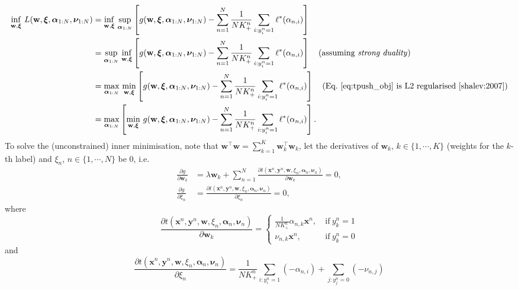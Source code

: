 \documentclass[9pt]{extarticle}
\newcommand{\x}{\mathbf{x}}
\newcommand{\y}{\mathbf{y}}
\newcommand{\1}{\mathbf{1}}
\newcommand{\w}{\mathbf{w}}
\newcommand{\alphabm}{\bm{\alpha}}
\newcommand{\nubm}{\bm{\nu}}
\newcommand{\xibm}{\bm{\xi}}
\newcommand{\ie}{i.e.\ }
\begin{document}
\begin{equation}
\label{eq:tpush_dual_func}
\begin{aligned}
\inf_{\w, \xibm} \, L(\w, \xibm, \alphabm_{1:N}, \nubm_{1:N})
&= \inf_{\w, \xibm} \, \underset{\alphabm_{1:N}}{\sup} \left[ g(\w, \xibm, \alphabm_{1:N}, \nubm_{1:N}) -
   \sum_{n=1}^N \frac{1}{N K_+^n} \sum_{i:y_i^n=1} \ell^*(\alpha_{n,i}) \right] \\
&= \underset{\alphabm_{1:N}}{\sup} \, \inf_{\w, \xibm} \left[ g(\w, \xibm, \alphabm_{1:N}, \nubm_{1:N}) -
   \sum_{n=1}^N \frac{1}{N K_+^n} \sum_{i:y_i^n=1} \ell^*(\alpha_{n,i}) \right] \quad 
   \text{(assuming \emph{strong duality})} \\
&= \underset{\alphabm_{1:N}}{\max} \, \min_{\w, \xibm} \left[ g(\w, \xibm, \alphabm_{1:N}, \nubm_{1:N}) -
   \sum_{n=1}^N \frac{1}{N K_+^n} \sum_{i:y_i^n=1} \ell^*(\alpha_{n,i}) \right] \quad
   \text{(Eq.~\ref{eq:tpush_obj} is L2 regularised~\cite{shalev:2007})} \\
&= \underset{\alphabm_{1:N}}{\max} \left[ \min_{\w, \xibm} \, g(\w, \xibm, \alphabm_{1:N}, \nubm_{1:N}) -
   \sum_{n=1}^N \frac{1}{N K_+^n} \sum_{i:y_i^n=1} \ell^*(\alpha_{n,i}) \right].
\end{aligned}
\end{equation}
%
To solve the (unconstrained) inner minimisation, 
note that $\w^\top \w = \sum_{k=1}^K \w_k^\top \w_k$,
let the derivatives of $\w_k, \, k \in \{1,\cdots,K\}$ (weights for the $k$-th label) and $\xi_n, \, n \in \{1,\cdots,N\}$ be 0, \ie
\begin{equation}
\label{eq:grad_eq_zero}
\begin{aligned}
\frac{\partial g}{\partial \w_k} 
&= \lambda \w_k + \sum_{n=1}^N \frac{\partial t(\x^n, \y^n, \w, \xi_n, \alphabm_n, \nubm_n)} {\partial \w_k} = 0, \\
\frac{\partial g}{\partial \xi_n} 
&= \frac{\partial t(\x^n, \y^n, \w, \xi_n, \alphabm_n, \nubm_n)} {\partial \xi_n} = 0,
\end{aligned}
\end{equation}
where 
\begin{equation}
\label{eq:grad_tw}
\frac{\partial t(\x^n, \y^n, \w, \xi_n, \alphabm_n, \nubm_n)} {\partial \w_k} =
\begin{cases}
\frac{1}{N K_+^n} \alpha_{n,k} \x^n, \ & \text{if} \ y_k^n = 1 \\
\nu_{n,k} \x^n, \ & \text{if} \ y_k^n = 0
\end{cases}
\end{equation}
and 
\begin{equation}
\label{eq:grad_txi}
\frac{\partial t(\x^n, \y^n, \w, \xi_n, \alphabm_n, \nubm_n)} {\partial \xi_n} 
= \frac{1}{N K_+^n} \sum_{i:y_i^n=1} (-\alpha_{n,i}) + \sum_{j:y_j^n=0} (-\nu_{n,j})
\end{equation}
\end{document}
